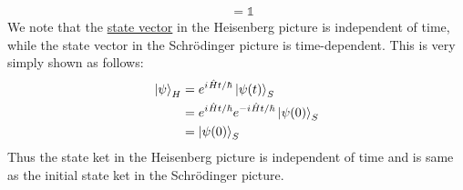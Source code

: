 \begin{enumerate}
\begin{align}
		&= \mathbb{1}
	\end{align}
	We note that the \underline{state vector} in the Heisenberg picture is independent of time, while the state vector in the Schr\"{o}dinger picture is time-dependent. This is very simply shown as follows:
	\begin{align}
		\ket{\psi}_H &= e^{{i\mkern1mu} \hat{H}t/\hbar} \ket{\psi(t)}_S \\
		&= e^{{i\mkern1mu} \hat{H}t/\hbar} e^{-{i\mkern1mu} \hat{H}t/\hbar} \ket{\psi(0)}_S\\
		&= \ket{\psi(0)}_S
	\end{align}
	Thus the state ket in the Heisenberg picture is independent of time and is same as the initial state ket in the Schr\"{o}dinger picture.
	
	\end{enumerate}



